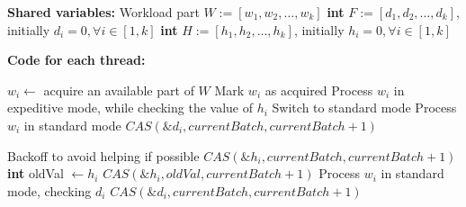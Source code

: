 \documentclass[a4paper,11pt,twoside,openany]{book}
\begin{document}
\begin{algorithm}[htbp]
    \footnotesize
    \vspace*{2mm}
    
    \begin{algorithmic}[1]
    
    \State \textbf{Shared variables:}
    \State Workload part $\mathit{W} := \mathit{[w_1, w_2, \ldots, w_k]}$ \label{alg:DRefresh:w}
    \State \textbf{int} $\mathit{F} := \mathit{[d_1, d_2, \ldots, d_k]}$, initially $\mathit{d_i} = 0, \forall i \in [1, k]$ \label{alg:DRefresh:d}
    \State \textbf{int} $\mathit{H} := \mathit{[h_1, h_2, \ldots, h_k]}$, initially $\mathit{h_i} = 0, \forall i \in [1, k]$ \label{alg:DRefresh:h}
    
    \vspace*{1mm}
    \State \textbf{Code for each thread:}
    
         \label{alg:DRefresh:process:start}
            \State $\mathit{w_i} \gets$ acquire an available part of $\mathit{W}$
            \State Mark $\mathit{w_i}$ as acquired
             \label{alg:DRefresh:process:if}
                \State Process $\mathit{w_i}$ in expeditive mode, while checking the value of $h_i$ \label{alg:DRefresh:process:expeditive}
                    \State Switch to standard mode
                \EndIf
            \Else
                \State Process $\mathit{w_i}$ in standard mode   \label{alg:DRefresh:process:standard}
            \EndIf
                \State $\mathit{CAS(\&d_i, currentBatch, currentBatch+1)}$ \label{alg:DRefresh:d:increase}
            \EndIf
        \EndWhile
        
         \label{alg:DRefresh:scan:ForAll} 
            \State Backoff to avoid helping if possible \label{alg:DRefresh:help:backoff}
             \label{alg:DRefresh:help:if}
                 \label{alg:DRefresh:h:true}
                    \State $\mathit{CAS(\&h_i, currentBatch, currentBatch+1)}$ 
                      \label{alg:DRefresh:h:fallenBehind}
                    \State \textbf{int} oldVal $\gets \mathit{h_i}$
                    \State $\mathit{CAS(\&h_i, oldVal, currentBatch+1)}$
                \EndIf
            \EndIf
            \State Process $\mathit{w_i}$ in standard mode, checking $\mathit{d_i}$
                \State $\mathit{CAS(\&d_i, currentBatch, currentBatch+1)}$ \label{alg:DRefresh:help:d:true}
            \EndIf
        \EndFor
    \EndProcedure
    

\end{algorithmic}
\end{algorithm}
\end{document}
